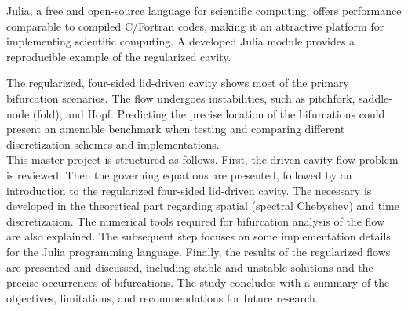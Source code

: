 Julia, a free and open-source language for scientific computing, offers
performance comparable to compiled C/Fortran codes, making it an attractive
platform for implementing scientific computing. A developed Julia module
provides a reproducible example of the regularized cavity.

The regularized, four-sided lid-driven cavity shows most of the primary
bifurcation scenarios. The flow undergoes instabilities, such as pitchfork,
saddle-node (fold), and Hopf. Predicting the precise location of the
bifurcations could present an amenable benchmark when testing and comparing
different discretization schemes and implementations. \\

This master project is structured as follows. First, the driven cavity flow
problem is reviewed. Then the governing equations are presented, followed by an
introduction to the regularized four-sided lid-driven cavity. The necessary is
developed in the theoretical part regarding spatial (spectral Chebyshev) and
time discretization. The numerical tools required for bifurcation analysis of
the flow are also explained. The subsequent step focuses on some implementation
details for the Julia programming language. Finally, the results of the
regularized flows are presented and discussed, including stable and unstable
solutions and the precise occurrences of bifurcations. The study concludes with
a summary of the objectives, limitations, and recommendations for future
research.
